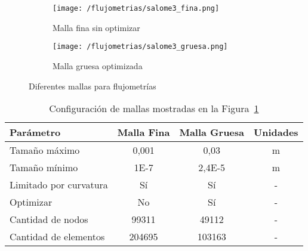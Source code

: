 \begin{figure}[t!]
    \centering
    \begin{subfigure}[t]{0.5\textwidth}
        \centering
        \texttt{[image: /flujometrias/salome3\_fina.png]}
        \caption{Malla fina sin optimizar}
    \end{subfigure}%
    \begin{subfigure}[t]{0.5\textwidth}
        \centering
        \texttt{[image: /flujometrias/salome3\_gruesa.png]}
        \caption{Malla gruesa optimizada}
    \end{subfigure}
    \caption{Diferentes mallas para flujometrías}\label{fig:salome_fina_gruesa}
\end{figure}

\begin{table}
    \centering
    \begin{tabular}{lccc} \toprule
        Parámetro                & Malla Fina    & Malla Gruesa     & Unidades\\ \midrule
        Tamaño máximo            & 0,001         & 0,03             & m \\
        Tamaño mínimo            & 1E-7          & 2,4E-5           & m \\
        Limitado por curvatura   & Sí            & Sí               & - \\
        Optimizar                & No            & Sí               & - \\
        Cantidad de nodos        & 99311         & 49112            & - \\
        Cantidad de elementos    & 204695        & 103163           & - \\ \bottomrule
    \end{tabular}
    \caption{Configuración de mallas mostradas en la Figura~\ref{fig:salome_fina_gruesa}}
    \label{tab:salome_fina_gruesa}
\end{table}
